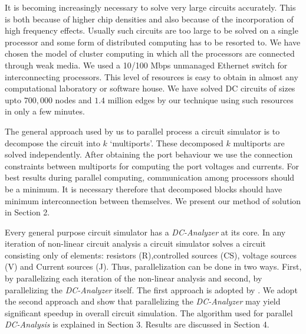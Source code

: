 \documentclass[10pt,psfig,letterpaper,twocolumn]{article}
\begin{document}
It is becoming increasingly necessary to solve very large circuits
accurately. This is both because of higher chip densities and also
because of
the incorporation of high frequency effects.
Usually such circuits are too large to be solved on a single
processor and some form of distributed computing has to be resorted to.
We have chosen the model of cluster computing in which all the processors are connected 
through  weak media. 
We used a 10/100 Mbps unmanaged Ethernet switch for interconnecting processors. 
This level of resources is easy to obtain in almost any computational
laboratory or software house. We have solved DC circuits of sizes
upto $700,000$ nodes and $1.4$ million edges by our technique 
using such resources in only a few minutes.
\par

The general approach used by us to parallel process a circuit simulator 
is to decompose the circuit into $k$ `multiports'. These
decomposed $k$ multiports are solved independently. 
After obtaining the port behaviour 
we use the connection constraints between multiports
for computing the port voltages and currents.
For best 
results during parallel computing, communication among processors should be a minimum. It is necessary therefore that  decomposed
blocks should have minimum interconnection between themselves.
We present our method of solution in
Section 2. 

Every general purpose circuit simulator has a {\it DC-Analyzer} at its core. In any iteration of non-linear circuit analysis a circuit simulator solves a 
circuit consisting only of elements: resistors (R),controlled sources (CS), voltage sources (V) and Current sources (J). Thus, parallelization can be done in two 
ways. First, by parallelizing each iteration of the non-linear analysis and second, by parallelizing the {\it DC-Analyzer} itself. The first 
approach is adopted by {\protect \cite{SIE}}. We adopt the second approach \cite{GAK,NJB,GT} and show that parallelizing the {\it DC-Analyzer} may yield 
significant speedup in overall circuit simulation. The algorithm used for parallel {\it DC-Analysis} is explained in Section 3. 
Results are discussed in Section 4. 

\section*{}
\end{document}

